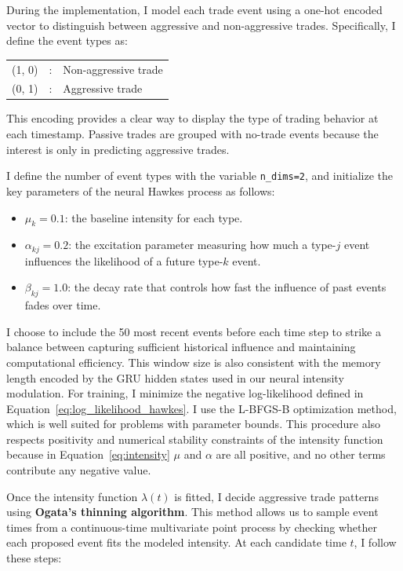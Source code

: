 During the implementation, I model each trade event using a one-hot encoded vector to distinguish between aggressive and non-aggressive trades. Specifically, I define the event types as:
\begin{center}
\begin{tabular}{lll}
(1, 0) & : & Non-aggressive trade \\
(0, 1) & : & Aggressive trade \\
\end{tabular}
\end{center}
This encoding provides a clear way to display the type of trading behavior at each timestamp. Passive trades are grouped with no-trade events because the interest is only in predicting aggressive trades.

I define the number of event types with the variable \texttt{n\_dims=2}, and initialize the key parameters of the neural Hawkes process as follows:

\begin{itemize}
    \item \( \mu_k = 0.1 \): the baseline intensity for each type.
    \item \( \alpha_{kj} = 0.2 \): the excitation parameter measuring how much a type-\( j \) event influences the likelihood of a future type-\( k \) event.
    \item \( \beta_{kj} = 1.0 \): the decay rate that controls how fast the influence of past events fades over time.
\end{itemize}

I choose to include the 50 most recent events before each time step to strike a balance between capturing sufficient historical influence and maintaining computational efficiency. This window size is also consistent with the memory length encoded by the GRU hidden states used in our neural intensity modulation. For training, I minimize the negative log-likelihood defined in Equation~\ref{eq:log_likelihood_hawkes}. I use the L-BFGS-B optimization method, which is well suited for problems with parameter bounds. This procedure also respects positivity and numerical stability constraints of the intensity function because in Equation~\ref{eq:intensity} $\mu$ and $\alpha$ are all positive, and no other terms contribute any negative value.

Once the intensity function \( \lambda(t) \) is fitted, I decide aggressive trade patterns using \textbf{Ogata's thinning algorithm}. This method allows us to sample event times from a continuous-time multivariate point process by checking whether each proposed event fits the modeled intensity. At each candidate time \( t \), I follow these steps:

